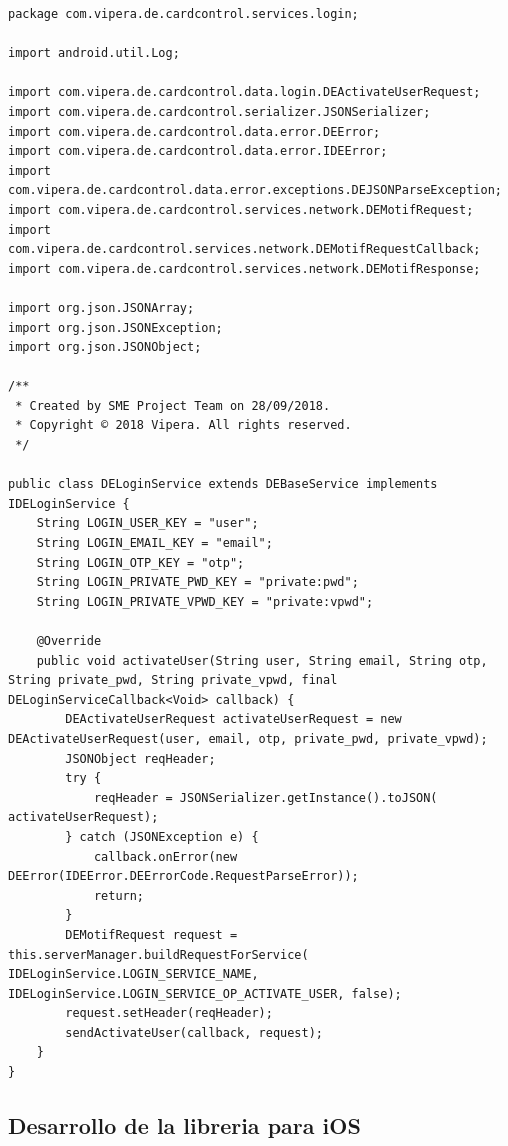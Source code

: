 \documentclass[a4paper, 12pt]{article}
\newenvironment{code}{\captionsetup{type=listing}}{}
\begin{document}
\begin{code}
\label{code:android-implementation}
\begin{verbatim}
package com.vipera.de.cardcontrol.services.login;

import android.util.Log;

import com.vipera.de.cardcontrol.data.login.DEActivateUserRequest;
import com.vipera.de.cardcontrol.serializer.JSONSerializer;
import com.vipera.de.cardcontrol.data.error.DEError;
import com.vipera.de.cardcontrol.data.error.IDEError;
import com.vipera.de.cardcontrol.data.error.exceptions.DEJSONParseException;
import com.vipera.de.cardcontrol.services.network.DEMotifRequest;
import com.vipera.de.cardcontrol.services.network.DEMotifRequestCallback;
import com.vipera.de.cardcontrol.services.network.DEMotifResponse;

import org.json.JSONArray;
import org.json.JSONException;
import org.json.JSONObject;

/**
 * Created by SME Project Team on 28/09/2018.
 * Copyright © 2018 Vipera. All rights reserved.
 */

public class DELoginService extends DEBaseService implements IDELoginService {
    String LOGIN_USER_KEY = "user";
    String LOGIN_EMAIL_KEY = "email";
    String LOGIN_OTP_KEY = "otp";
    String LOGIN_PRIVATE_PWD_KEY = "private:pwd";
    String LOGIN_PRIVATE_VPWD_KEY = "private:vpwd";

    @Override
    public void activateUser(String user, String email, String otp, String private_pwd, String private_vpwd, final DELoginServiceCallback<Void> callback) {
        DEActivateUserRequest activateUserRequest = new DEActivateUserRequest(user, email, otp, private_pwd, private_vpwd);
        JSONObject reqHeader;
        try {
            reqHeader = JSONSerializer.getInstance().toJSON( activateUserRequest);
        } catch (JSONException e) {
            callback.onError(new DEError(IDEError.DEErrorCode.RequestParseError));
            return;
        }
        DEMotifRequest request = this.serverManager.buildRequestForService( IDELoginService.LOGIN_SERVICE_NAME, IDELoginService.LOGIN_SERVICE_OP_ACTIVATE_USER, false);
        request.setHeader(reqHeader);
        sendActivateUser(callback, request);
    }
}

\end{verbatim}
\end{code}
\bigbreak
\subsection{Desarrollo de la libreria para iOS}
\label{sec-4-2}
\end{document}
